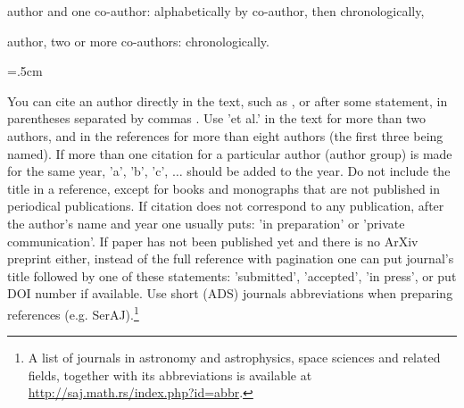 \documentclass{article_saj}
\begin{document}
\par\hang{}  author and one co-author: alphabetically by co-author, then
chronologically,

\par\hang{} author, two or more co-authors: chronologically.

\parindent=.5cm

You can cite an author directly in the text, such as \citet{1986Ber},
or after some statement, in parentheses separated by
commas \citep{2020Doe,1978Bel,1983All,1987Bin,1998Cas,2004Uro,2005Cir,2007Met,2008Ive,2020Smith,
2015aste.book..297N}. Use
'et al.' in the text for more than two authors, and in the
references for more than eight authors (the first three being named). If more than one citation
for a particular author (author group) is made for the same year,
'a', 'b', 'c', $\ldots$ should be added to the year. Do not
include the title in a reference, except for books and monographs
that are not published in periodical publications. If citation does
not correspond to any publication, after the author's name and
year one usually puts: 'in preparation' or 'private communication'.
If paper has not been published yet and there is no ArXiv preprint
either, instead of the full reference with pagination one can put
journal's title followed by one of these statements: 'submitted',
'accepted', 'in press', or put DOI number if available. Use short (ADS)
journals abbreviations when preparing references (e.g.
SerAJ).\footnote{A list of journals in astronomy and
astrophysics, space sciences and related fields, together with its
abbreviations is available at
\url{http://saj.math.rs/index.php?id=abbr}.}





\newcommand\eprint{in press }

\bibsep=0pt



{\small


}
\end{document}
